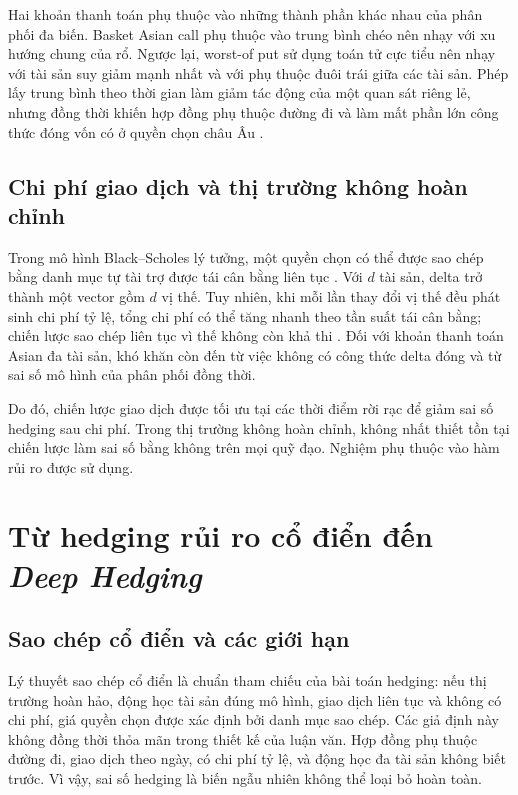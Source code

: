 Hai khoản thanh toán phụ thuộc vào những thành phần khác nhau của phân phối đa biến. Basket Asian
call phụ thuộc vào trung bình chéo nên nhạy với xu hướng chung của rổ. Ngược
lại, worst-of put sử dụng toán tử cực tiểu nên nhạy với tài sản suy giảm mạnh
nhất và với phụ thuộc đuôi trái giữa các tài sản. Phép lấy trung bình theo thời
gian làm giảm tác động của một quan sát riêng lẻ, nhưng đồng thời khiến hợp
đồng phụ thuộc đường đi và làm mất phần lớn công thức đóng vốn có ở quyền chọn
châu Âu \parencite{KemnaVorst1990}.

\subsection{Chi phí giao dịch và thị trường không hoàn chỉnh}

Trong mô hình Black--Scholes lý tưởng, một quyền chọn có thể được sao chép bằng
danh mục tự tài trợ được tái cân bằng liên tục \parencite{BlackScholes1973}.
Với $d$ tài sản, delta trở thành một vector gồm $d$ vị thế. Tuy nhiên, khi mỗi
lần thay đổi vị thế đều phát sinh chi phí tỷ lệ, tổng chi phí có thể tăng nhanh
theo tần suất tái cân bằng; chiến lược sao chép liên tục vì thế không còn khả
thi \parencite{Leland1985}. Đối với khoản thanh toán Asian đa tài sản, khó khăn còn đến
từ việc không có công thức delta đóng và từ sai số mô hình của phân phối đồng
thời.

Do đó, chiến lược giao dịch được tối ưu tại các thời điểm rời rạc để giảm sai
số hedging sau chi phí. Trong thị trường không hoàn chỉnh, không nhất thiết
tồn tại chiến lược làm sai số bằng không trên mọi quỹ đạo. Nghiệm phụ thuộc vào
hàm rủi ro được sử dụng.

\section{Từ hedging rủi ro cổ điển đến \textit{Deep Hedging}}
\label{sec:c2-deep-hedging}

\subsection{Sao chép cổ điển và các giới hạn}

Lý thuyết sao chép cổ điển là chuẩn tham chiếu của bài toán hedging: nếu thị
trường hoàn hảo, động học tài sản đúng mô hình, giao dịch liên tục và không có
chi phí, giá quyền chọn được xác định bởi danh mục sao chép. Các giả định này
không đồng thời thỏa mãn trong thiết kế của luận văn. Hợp đồng phụ thuộc đường
đi, giao dịch theo ngày, có chi phí tỷ lệ, và động học đa tài sản không biết
trước. Vì vậy, sai số hedging là biến ngẫu nhiên không thể loại bỏ hoàn
toàn.

